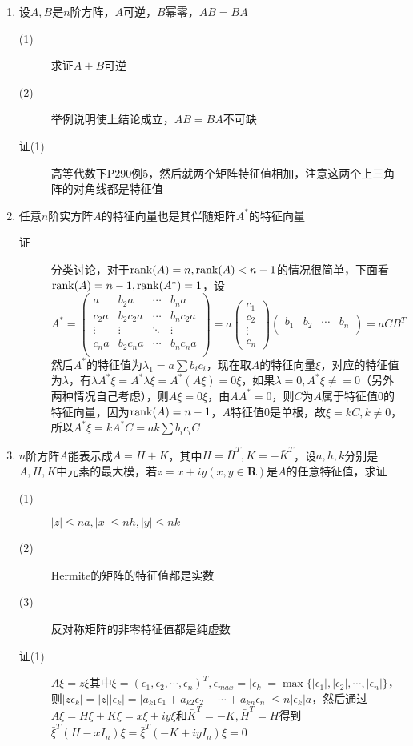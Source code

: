 \begin{enumerate}
\item 设$A,B$是$n$阶方阵，$A$可逆，$B$幂零，$AB=BA$
\begin{description}
\item[(1)] 求证$A+B$可逆
\item[(2)] 举例说明使上结论成立，$AB=BA$不可缺
\item[证(1)] 高等代数下P290例5，然后就两个矩阵特征值相加，注意这两个上三角阵的对角线都是特征值
\end{description}

\item 任意$n$阶实方阵$A$的特征向量也是其伴随矩阵$A^*$的特征向量
\begin{description}
\item[证] 分类讨论，对于$\operatorname{rank}(A)=n,\operatorname{rank}(A)<n-1$的情况很简单，下面看$\operatorname{rank}(A)=n-1,\operatorname{rank}(A^*)=1$，设
\[
A^*=\left(
\begin{array}{cccc}
a & b_2a & \cdots & b_na \\
c_2a & b_2c_2a & \cdots & b_nc_2a \\
\vdots & \vdots &\ddots & \vdots \\
c_na & b_2c_na & \cdots & b_nc_na \\
\end{array}
\right)=a\left(
\begin{array}{c}
c_1\\
c_2\\
\vdots\\
c_n
\end{array}
\right)\left(
\begin{array}{cccc}
b_1 & b_2 & \cdots & b_n \\
\end{array}
\right)=aCB^T
\]
然后$A^*$的特征值为$\lambda_1=a\sum b_ic_i$，现在取$A$的特征向量$\xi$，对应的特征值为$\lambda$，有$\lambda A^*\xi = A^*\lambda\xi = A^*(A\xi)=0\xi$，如果$\lambda=0,A^*\xi\neq =0$（另外两种情况自己考虑），则$A\xi=0\xi$，由$AA^*=0$，则$C$为$A$属于特征值$0$的特征向量，因为$\operatorname{rank}(A)=n-1$，$A$特征值$0$是单根，故$\xi=kC,k\neq 0$，所以$A^*\xi=kA^*C=ak\sum b_ic_iC$
\end{description}

\item $n$阶方阵$A$能表示成$A=H+K$，其中$H=\bar{H}^T,K=-\bar{K}^T$，设$a,h,k$分别是$A,H,K$中元素的最大模，若$z=x+iy(x,y\in \mathbf{R})$是$A$的任意特征值，求证
\begin{description}
\item[(1)] $|z|\leq na,|x|\leq nh,|y|\leq nk$
\item[(2)] Hermite的矩阵的特征值都是实数
\item[(3)] 反对称矩阵的非零特征值都是纯虚数
\item[证(1)] $A\xi=z\xi$其中$\xi=(\epsilon_1,\epsilon_2,\cdots,\epsilon_n)^T,\epsilon_{max}=|\epsilon_k|=\max\{|\epsilon_1|,|\epsilon_2|,\cdots,|\epsilon_n|\}$，则$|z\epsilon_k|=|z||\epsilon_k|=|a_{k1}\epsilon_1+a_{k2}\epsilon_2+\cdots+a_{kn}\epsilon_n|\leq n|\epsilon_k|a$，然后通过$A\xi=H\xi+K\xi=x\xi+iy\xi$和$\bar{K}^T=-K,\bar{H}^T=H$得到$\bar{\xi}^T(H-xI_n)\xi=\bar{\xi}^T(-K+iyI_n)\xi=0$
\end{description}


\end{enumerate}
